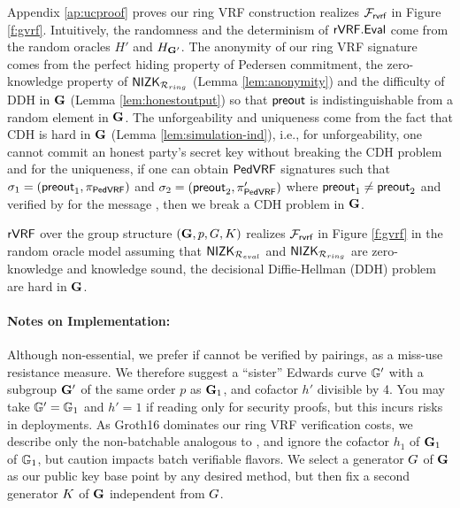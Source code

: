 

Appendix \ref{ap:ucproof} proves our ring VRF construction realizes $ \mathcal{F}_{\textsf{rvrf}} $ in Figure \ref{f:gvrf}. Intuitively, the randomness and the determinism of $ {\mathsf{rVRF}}.{\mathsf{Eval}} $ come from the random oracles $ H' $ and $ H_{{\mathbf{G}}'} $.  The anonymity of our ring VRF signature comes from the perfect hiding property of Pedersen commitment, the zero-knowledge property of $ {\mathsf{NIZK}}_{\mathcal{R}_{ring}} $ (Lemma \ref{lem:anonymity}) and the difficulty of DDH in  $ {\mathbf{G}} $ (Lemma \ref{lem:honestoutput}) so that $ {\mathsf{preout}} $ is indistinguishable from a random element in $ {\mathbf{G}} $. The unforgeability and uniqueness come from the fact that CDH is hard in $ {\mathbf{G}} $ (Lemma \ref{lem:simulation-ind}), i.e., for unforgeability,  one cannot commit an honest party's secret key without breaking the CDH problem and for the uniqueness,  if one can obtain $ {\mathsf{PedVRF}} $ signatures such that $ \sigma_1 = ({\mathsf{preout}}_1, \pi_{{\mathsf{PedVRF}}}) $ and $ \sigma_2 = ({\mathsf{preout}}_2, \pi'_{{\mathsf{PedVRF}}}) $ where  $ {\mathsf{preout}}_1 \neq {\ensuremath{\mathsf{preout}}}_2 $  and verified by \compk for the message \msg, then we break a CDH problem in $ {\mathbf{G}} $.

\begin{theorem}\label{thm:rvrfmain}
$ {\mathsf{rVRF}} $  over the group structure $ ({\mathbf{G}},p,G,K) $ realizes $ \mathcal{F}_{\textsf{rvrf}} $ in Figure \ref{f:gvrf} in the random oracle model assuming that $ {\mathsf{NIZK}}_{\mathcal{R}_{eval}} $ and $ {\mathsf{NIZK}}_{\mathcal{R}_{ring}}$ are zero-knowledge and knowledge sound, the decisional Diffie-Hellman (DDH) problem are hard in $ {\mathbf{G}}  $. 
\end{theorem}



\paragraph{Notes on Implementation:} Although non-essential, we prefer if \PreOut cannot be verified
by pairings, as a miss-use resistance measure.
We therefore suggest a ``sister'' Edwards curve ${\mathbb{G}}'$ with
a subgroup ${\mathbf{G}}'$ of the same order $p$ as ${\mathbf{G}}_1$,
and cofactor $h'$ divisible by 4.
You may take ${\mathbb{G}}' = {\mathbb{G}}_1$ and $h' = 1$ if reading only for
security proofs, but this incurs risks in deployments.
%
As Groth16 dominates our ring VRF verification costs, we describe only
the non-batchable \PedVRF analogous to \cite{nsec5,VXEd25519,draft-irtf-cfrg-vrf-10},
and ignore the cofactor $h_1$ of ${\mathbf{G}}_1$ of ${\mathbb{G}}_1$, 
but caution \cite{HdVBatchEd25519} impacts batch verifiable flavors.
%
We select a generator $G$ of ${\mathbf{G}}$ as our public key base point
by any desired method, but then
fix a second generator $K$ of ${\mathbf{G}}$ independent from $G$.



